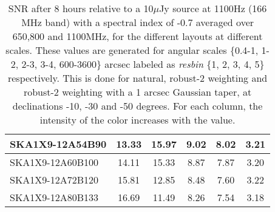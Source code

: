 \begin{table}[H]
{{\begin{tabular}{|lccccc|}
SKA1X9-12A54B90 & 13.33 \cellcolor{blue!19.10} & 15.97 \cellcolor{red!60.00} & 9.02 \cellcolor{green!59.45} & 8.02 \cellcolor{orange!40.40} & 3.21 \cellcolor{purple!24.63}\\ \hline 
SKA1X9-12A60B100 & 14.11 \cellcolor{blue!28.59} & 15.33 \cellcolor{red!54.99} & 8.87 \cellcolor{green!51.27} & 7.87 \cellcolor{orange!33.40} & 3.20 \cellcolor{purple!22.42}\\ \hline 
SKA1X9-12A72B120 & 15.81 \cellcolor{blue!49.29} & 12.85 \cellcolor{red!35.60} & 8.48 \cellcolor{green!30.00} & 7.60 \cellcolor{orange!20.80} & 3.22 \cellcolor{purple!26.84}\\ \hline 
SKA1X9-12A80B133 & 16.69 \cellcolor{blue!60.00} & 11.49 \cellcolor{red!24.96} & 8.26 \cellcolor{green!18.00} & 7.54 \cellcolor{orange!18.00} & 3.18 \cellcolor{purple!18.00}\\ \hline 
\end{tabular}}
\vspace{0.000000cm}
\hspace{1cm} 
\vspace{0.000000cm}
\hspace{1cm} 

\vspace{.25cm}
\caption{SNR after 8 hours relative to a 10$\mu$Jy source at 1100Hz (166 MHz band) with a spectral index of -0.7 averaged over 650,800 and 1100MHz, for the different layouts at different scales. These values are generated for angular scales \{0.4-1, 1-2, 2-3, 3-4, 600-3600\} arcsec labeled as {\it resbin} \{1, 2, 3, 4, 5\} respectively. This is done for natural, robust-2 weighting and robust-2 weighting with a 1 arcsec Gaussian taper, at declinations -10, -30 and -50 degrees. For each column, the intensity of the color increases with the value.}\label{tab:snravg}}
 \end{table}
